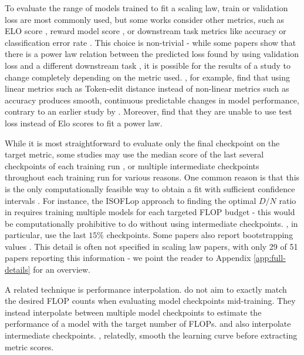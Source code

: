  
To evaluate the range of models trained to fit a scaling law, train or validation loss are most commonly used, but some works consider other metrics, such as ELO score \citep{jones2021scaling,neumann2022scaling}, reward model score \citep{gao2023scaling}, or downstream task metrics like accuracy or classification error rate \citep{henighan2020scaling,zhai2022scaling,cherti2023reproducible,goyal2024scaling,gao2023scaling}. This choice is non-trivial - while some papers show that there is a power law relation between the predicted loss found by using validation loss and a different downstream task \citep{dubey2024llama}, it is possible for the results of a study to change completely depending on the metric used. \citet{schaeffer2023emergent}, for example, find that using linear metrics such as Token-edit distance instead of non-linear metrics such as accuracy produces smooth, continuous predictable changes in model performance, contrary to an earlier study by \citet{wei2022emergent}. Moreover, \citet{neumann2022scaling} find that they are unable to use test loss instead of Elo scores  to fit a power law.

While it is most straightforward to evaluate only the final checkpoint on the target metric, some studies may use the median score of the last several checkpoints of each training run \citet{ghorbani2021scaling}, or multiple intermediate checkpoints throughout each training run for various reasons. One common reason is that this is the only computationally feasible way to obtain a fit with sufficient confidence intervals \citep{besiroglu2024chinchilla}. For instance, the ISOFLop approach to finding the optimal $D/N$ ratio in \citet{hoffmann2022training} requires training multiple models for each targeted FLOP budget - this would be computationally prohibitive to do without using intermediate checkpoints. \citet{hoffmann2022training}, in particular, use the last $15\%$ checkpoints. Some papers also report bootstrapping values \citep{ivgi2022scaling}. This detail is often not specified in scaling law papers, with only 29 of 51 papers reporting this information - we point the reader to Appendix \ref{app:full-details} for an overview.

A related technique is performance interpolation. \citet{porian2024resolving} do not aim to exactly match the desired FLOP counts when evaluating model checkpoints mid-training. They instead interpolate between multiple model checkpoints to estimate the performance of a model with the target number of FLOPs. \citet{hoffmann2022training} and \citet{tao2024scaling} also interpolate intermediate checkpoints. \citet{hilton2023scaling}, relatedly, smooth the learning curve before extracting metric scores. 

